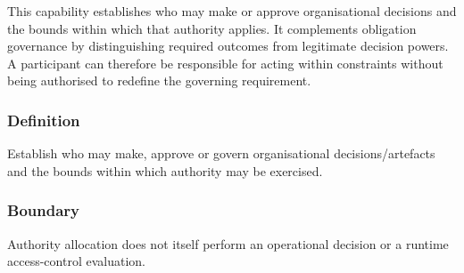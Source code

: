 This capability establishes who may make or approve organisational decisions and the bounds within which that authority applies. It complements obligation governance by distinguishing required outcomes from legitimate decision powers. A participant can therefore be responsible for acting within constraints without being authorised to redefine the governing requirement.

\subsubsection*{Definition}

Establish who may make, approve or govern organisational decisions/\allowbreak{}artefacts and the bounds within which authority may be exercised.

\subsubsection*{Boundary}

Authority allocation does not itself perform an operational decision or a runtime access-control evaluation.


